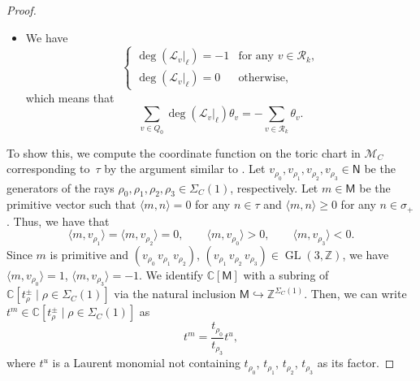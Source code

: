 \documentclass[pdftex]{sigma}
\numberwithin{equation}{section}
\theoremstyle{definition}
\newcommand{\ZZ}{\mathbb{Z}}
\newcommand{\CC}{\mathbb{C}}
\newcommand{\calL}{\mathcal{L}}
\newcommand{\calM}{\mathcal{M}}
\newcommand{\calR}{\mathcal{R}}
\newcommand{\sfM}{\mathsf{M}}
\newcommand{\sfN}{\mathsf{N}}
\newcommand{\GL}{\operatorname{GL}}
\begin{document}
\begin{proof}
\begin{itemize}
\begin{equation}
\begin{cases}
\deg(\calL_v |_\ell)=1 & \text{for any $v\in \calR_k$},\\
\deg(\calL_v |_\ell)=0 & \text{otherwise},
\end{cases}
\end{equation}
which means that
\begin{equation}
\label{eq_degree_linebdl_sum}
\sum_{v\in Q_0}\deg(\calL_v |_\ell)\theta_v=\sum_{v\in \calR_k}\theta_v.
\end{equation}
\item[(Case 2)] We have
\begin{equation}
\label{eq_degree_linebdl_main2}
\begin{cases}
\deg(\calL_v |_\ell)=-1 & \text{for any $v\in \calR_k$},\\
\deg(\calL_v |_\ell)=0 & \text{otherwise},
\end{cases}
\end{equation}
which means that
\begin{equation}\label{eq_degree_linebdl_sum2}
\sum_{v\in Q_0}\deg(\calL_v |_\ell)\theta_v=-\sum_{v\in \calR_k}\theta_v.
\end{equation}
\end{itemize}

To show this, we compute the coordinate function on the toric chart in $\calM_C$ corresponding to~$\tau$
by the argument similar to \cite[Proposition~4.9]{CHT}.
Let $v_{\rho_0}, v_{\rho_1}, v_{\rho_2}, v_{\rho_3}\in\sfN$ be the generators of the rays $\rho_0, \rho_1, \rho_2, \rho_3\in\Sigma_C(1)$, respectively.
Let $m\in\sfM$ be the primitive vector such that $\langle m, n\rangle=0$ for any $n\in\tau$ and $\langle m, n\rangle\ge0$ for any $n\in\sigma_+$.
Thus, we have that
\[
\langle m, v_{\rho_1}\rangle=\langle m, v_{\rho_2}\rangle=0, \qquad \langle m, v_{\rho_0}\rangle>0, \qquad \langle m, v_{\rho_3}\rangle<0.
\]
Since $m$ is primitive and $(v_{\rho_0}\, v_{\rho_1}\, v_{\rho_2})$, $(v_{\rho_1}\, v_{\rho_2}\, v_{\rho_3})\in\GL(3,\ZZ)$,
we have $\langle m, v_{\rho_0}\rangle=1$, $\langle m, v_{\rho_3}\rangle=-1$.
We identify $\CC[\sfM]$ with a subring of $\CC[t^{\pm}_\rho \mid \rho\in\Sigma_C(1)]$ via the natural inclusion
$\sfM\hookrightarrow \ZZ^{\Sigma_C(1)}$. Then, we can write $t^m\in \CC[t^{\pm}_\rho \mid \rho\in\Sigma_C(1)]$ as
\[
t^m=\frac{t_{\rho_0}}{t_{\rho_3}} t^u,
\]
where $t^u$ is a Laurent monomial not containing $t_{\rho_0}$, $t_{\rho_1}$, $t_{\rho_2}$, $t_{\rho_3}$ as its factor.


\end{proof}
\end{document}
